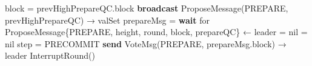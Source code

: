 \documentclass[a4paper]{article}
\begin{document}
\begin{algorithm}
\begin{algorithmic}[1]
                \State block = {\color{MidnightBlue} prevHighPrepareQC}.block
            \EndIf
            \State \textbf{broadcast} ProposeMessage(PREPARE, {\color{MidnightBlue} prevHighPrepareQC}) → valSet
        \Else \quad {\color{Gray} { // IsReplica}}
            \State prepareMsg = \textbf{wait} for ProposeMessage\{PREPARE, height, round, block, prepareQC\} ← leader
               = nil
               = nil
              \State step = PRECOMMIT
              \State \textbf{send} VoteMsg(PREPARE, prepareMsg.block) → leader
            \Else
              \State InterruptRound()
            \EndIf
          \EndIf
    \end{algorithmic}
\end{algorithm}
\end{document}
